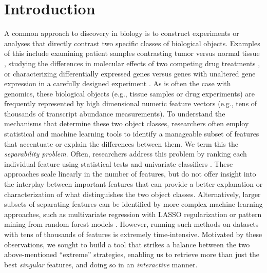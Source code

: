 
\section{Introduction}
\label{sec:intro}

A common approach to discovery in biology
is to construct experiments or analyses that directly
contrast two specific classes of biological objects.
Examples of this include examining patient samples
contrasting tumor versus normal tissue \needcite{},
studying the differences in molecular effects
of two competing drug treatments \needcite{},
or characterizing differentially expressed genes
versus genes with unaltered gene expression
in a carefully designed experiment \needcite{}.
As is often the case with genomics, these
biological objects (e.g., tissue samples or drug experiments)
are frequently represented by high dimensional numeric feature vectors (e.g., tens of thousands of transcript abundance measurements).
To understand the mechanisms that determine 
these two object classes,
researchers often employ statistical and
machine learning tools to identify a
manageable subset of features that
accentuate or explain the differences between them.
We term this the {\em separability problem}.
Often, researchers address this problem
by ranking each individual feature
using statistical tests \needcite{}
and univariate classifiers \needcite{}.
These approaches scale linearly in the number of features,
but do not offer insight into the interplay
between important features that can provide a better
explanation or characterization of what
distinguishes the two object classes.
Alternatively, larger subsets of separating
features can be identified by more complex 
machine learning approaches, such as multivariate 
regression with LASSO regularization \needcite{} 
or pattern mining from random forest models .
However, running such methods on datasets with 
tens of thousands of features is extremely time-intensive.
Motivated by these observations,
we sought to build a tool that strikes a balance between the
two above-mentioned ``extreme''
strategies, enabling us to retrieve more than just the best {\em singular} features, and doing so in an {\em interactive} manner.

